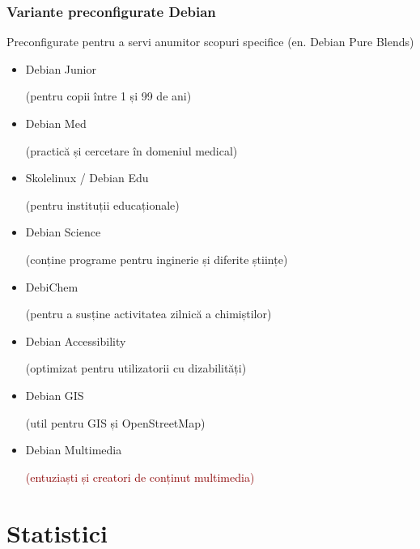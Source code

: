 \documentclass[xcolor=dvipsnames]{beamer}
\begin{document}
\begin{frame}
\frametitle{Variante preconfigurate Debian}
\begin{block}
{Preconfigurate pentru a servi anumitor scopuri specifice}
(en. Debian Pure Blends)\\
\begin{itemize}
\item Debian Junior
	\begin{footnotesize}
		(pentru copii între 1 și 99 de ani)
	\end{footnotesize} 
\item Debian Med
	\begin{footnotesize}
		(practică și cercetare în domeniul medical)
	\end{footnotesize} 
\item Skolelinux / Debian Edu
	\begin{footnotesize}
		(pentru instituții educaționale)
	\end{footnotesize} 
\item Debian Science
	\begin{footnotesize}
		(conține programe pentru inginerie și diferite științe)
	\end{footnotesize} 
\item DebiChem
	\begin{footnotesize}
		(pentru a susține activitatea zilnică a chimiștilor)
	\end{footnotesize} 
\item Debian Accessibility
	\begin{footnotesize}
		(optimizat pentru utilizatorii cu dizabilități)
	\end{footnotesize} 
\item Debian GIS
	\begin{footnotesize}
		(util pentru GIS și OpenStreetMap)
	\end{footnotesize} 
\item Debian Multimedia
	\begin{footnotesize}
		\textcolor{darkred}{(entuziaști și creatori de conținut multimedia)}
	\end{footnotesize} 
\end{itemize}
\end{block}
\end{frame}

\section{Statistici}
\end{document}
